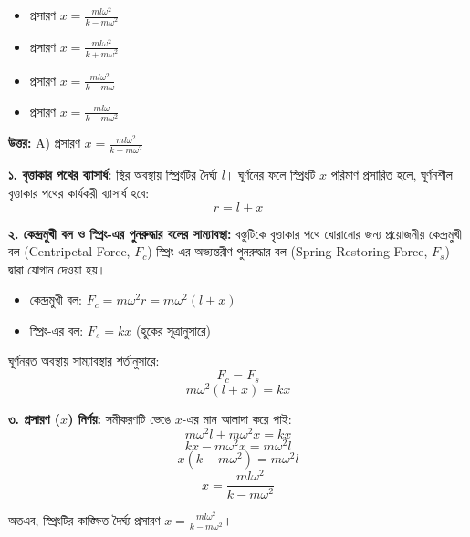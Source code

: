 \documentclass[12pt, a4paper]{article}
\begin{document}
\begin{itemize}[label={}, leftmargin=1cm, itemsep=0.5em]
\item[\textbf{A)}] প্রসারণ $x = \frac{m l \omega^2}{k - m \omega^2}$
\item[\textbf{B)}] প্রসারণ $x = \frac{m l \omega^2}{k + m \omega^2}$
\item[\textbf{C)}] প্রসারণ $x = \frac{m l \omega^2}{k - m \omega}$
\item[\textbf{D)}] প্রসারণ $x = \frac{m l \omega}{k - m \omega^2}$
\end{itemize}

\vspace{0.5em}
\begin{tcolorbox}[answerbox]
\textbf{\color{success} উত্তর:} A) প্রসারণ $x = \frac{m l \omega^2}{k - m \omega^2}$
\end{tcolorbox}
\vspace{1em}

\begin{tcolorbox}[solutionbox={সমাধান (Solution)}]
\noindent
\textbf{১. বৃত্তাকার পথের ব্যাসার্ধ:}
স্থির অবস্থায় স্প্রিংটির দৈর্ঘ্য $l$। ঘূর্ণনের ফলে স্প্রিংটি $x$ পরিমাণ প্রসারিত হলে, ঘূর্ণনশীল বৃত্তাকার পথের কার্যকরী ব্যাসার্ধ হবে:
$$r = l + x$$

\textbf{২. কেন্দ্রমুখী বল ও স্প্রিং-এর পুনরুদ্ধার বলের সাম্যাবস্থা:}
বস্তুটিকে বৃত্তাকার পথে ঘোরানোর জন্য প্রয়োজনীয় কেন্দ্রমুখী বল (Centripetal Force, $F_c$) স্প্রিং-এর অভ্যন্তরীণ পুনরুদ্ধার বল (Spring Restoring Force, $F_s$) দ্বারা যোগান দেওয়া হয়।
\begin{itemize}[leftmargin=1.5em, itemsep=0.2em]
    \item কেন্দ্রমুখী বল: $F_c = m \omega^2 r = m \omega^2 (l + x)$
    \item স্প্রিং-এর বল: $F_s = k x$ (হুকের সূত্রানুসারে)
\end{itemize}
ঘূর্ণনরত অবস্থায় সাম্যাবস্থার শর্তানুসারে:
$$F_c = F_s$$
$$m \omega^2 (l + x) = k x$$

\textbf{৩. প্রসারণ ($x$) নির্ণয়:}
সমীকরণটি ভেঙে $x$-এর মান আলাদা করে পাই:
$$m \omega^2 l + m \omega^2 x = k x$$
$$k x - m \omega^2 x = m \omega^2 l$$
$$x (k - m \omega^2) = m \omega^2 l$$
$$x = \frac{m l \omega^2}{k - m \omega^2}$$

অতএব, স্প্রিংটির কাঙ্ক্ষিত দৈর্ঘ্য প্রসারণ $x = \frac{m l \omega^2}{k - m \omega^2}$।
\end{tcolorbox}
\vspace{1em}
\end{document}

